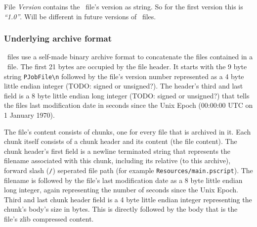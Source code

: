 File \textit{Version} contains the \pjob\ file's version as string.
So for the first version this is \textit{``1.0''}. Will be different in future versions of \pjob\ files.

\subsubsection{Underlying archive format}
\label{pjob:archive_format}
\pjob\ files use a self-made binary archive format to concatenate the files contained in a \pjob\ file.
The first 21 bytes are occupied by the file header.
It starts with the 9 byte string \texttt{PJobFile\textbackslash n}
followed by the file's version number represented as a 4 byte little endian integer (TODO: signed or unsigned?).
The header's third and last field is a 8 byte little endian long integer (TODO: signed or unsigned?)
that tells the files last modification date in seconds since the Unix Epoch (00:00:00 UTC on 1 January 1970).

The file's content consists of chunks,
one for every file that is archived in it.
Each chunk itself consists of a chunk header and its content (the file content).
The chunk header's first field is a newline terminated string that represents the filename
associated with this chunk,
including its relative (to this archive), forward slash (\texttt{/})
seperated file path (for example \texttt{Resources/main.pscript}).
The filename is followed by the file's last modification date as a 8 byte little endian long integer,
again representing the number of seconds since the Unix Epoch.
Third and last chunk header field is a 4 byte little endian integer representing
the chunk's body's size in bytes.
This is directly followed by the body that is the file's zlib compressed content.

